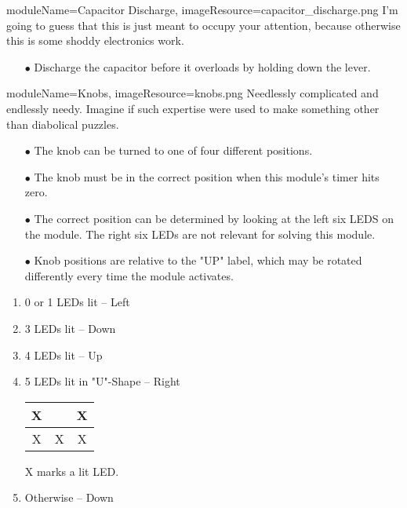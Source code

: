 \documentclass{../../ktane-mod}
\begin{document}
\begin{needymodule}{
  moduleName=Capacitor Discharge,
  imageResource=capacitor_discharge.png
}
{
  I'm going to guess that this is just meant to occupy your attention, because otherwise this is some shoddy electronics work.
}
  \begin{itemize}
    \item[$\bullet$] Discharge the capacitor before it overloads by holding down the lever.
  \end{itemize}

\end{needymodule}

\begin{needymodule}{
  moduleName=Knobs,
  imageResource=knobs.png
}
{
  Needlessly complicated and endlessly needy.
  Imagine if such expertise were used to make something other than diabolical puzzles.
}
  \begin{itemize}
    \item[$\bullet$] The knob can be turned to one of four different positions.
    \item[$\bullet$] The knob must be in the correct position when this module's timer hits zero.
    \item[$\bullet$] The correct position can be determined by looking at the left six LEDS on the module.
    The right six LEDs are not relevant for solving this module.
    \item[$\bullet$] Knob positions are relative to the "UP" label, which may be rotated differently every time the module activates.
  \end{itemize}

  \begin{enumerate}[label=\alph{enumi}.]
    \item 0 or 1 LEDs lit -- Left
    \item 3 LEDs lit -- Down
    \item 4 LEDs lit -- Up
    \item 5 LEDs lit in "U"-Shape -- Right\\
    \vspace{0.2cm}
    \begin{tabular}{|c|c|c|}
    \hline
    X & & X \\
    \hline
    X & X & X \\
    \hline
    \end{tabular} \quad X marks a lit LED\@.
    \item Otherwise -- Down
  \end{enumerate}

\end{needymodule}
\end{document}
